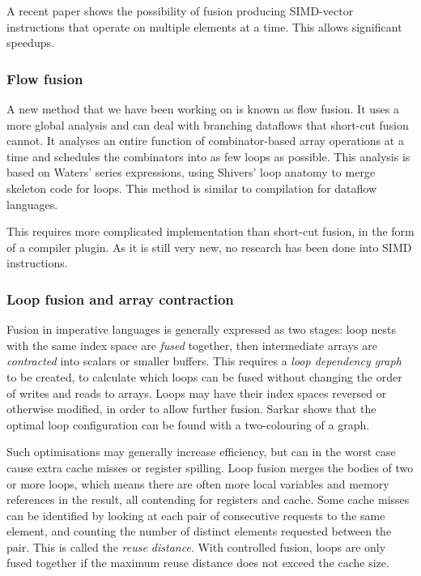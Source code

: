 A recent paper shows the possibility of fusion producing SIMD-vector instructions\cite{bik2004software} that operate on multiple elements at a time\cite{mainland2013haskell}.
This allows significant speedups.


\subsubsection{Flow fusion}

A new method that we have been working on is known as flow fusion\cite{lippmeier2013flow}.
It uses a more global analysis and can deal with branching dataflows that short-cut fusion cannot.
It analyses an entire function of combinator-based array operations at a time and schedules the combinators into as few loops as possible.
This analysis is based on Waters' series expressions\cite{waters1991automatic}, using Shivers' loop anatomy\cite{shivers2005anatomy} to merge skeleton code for loops.
This method is similar to compilation for dataflow languages\cite{johnston2004advances}.

This requires more complicated implementation than short-cut fusion, in the form of a compiler plugin.
As it is still very new, no research has been done into SIMD instructions.


\subsubsection{Loop fusion and array contraction}

Fusion in imperative languages is generally expressed as two stages:
loop nests with the same index space are \emph{fused} together,
then intermediate arrays are \emph{contracted} into scalars or smaller buffers.
This requires a \emph{loop dependency graph}\cite{gao1993collective} to be created,
to calculate which loops can be fused without changing the order of writes and reads to arrays.
Loops may have their index spaces reversed or otherwise modified, in order to allow further fusion.
Sarkar shows that the optimal loop configuration can be found with a two-colouring of a graph\cite{sarkar1991optimization}.

Such optimisations may generally increase efficiency, but can in the worst case cause extra cache misses or register spilling.
Loop fusion merges the bodies of two or more loops, which means there are often more local variables
and memory references in the result, all contending for registers and cache.
Some cache misses can be identified by looking at each pair of consecutive requests to the same element, and counting the number of distinct elements requested between the pair.
This is called the \emph{reuse distance}\cite{song2004improving}.
With controlled fusion, loops are only fused together if the maximum reuse distance does not exceed the cache size. 

